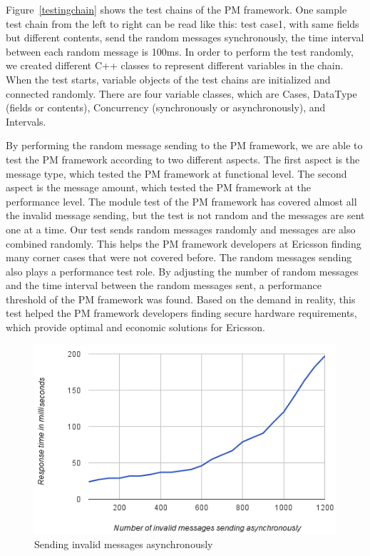 Figure~\ref{testingchain} shows the test chains of the PM framework. One sample test chain from the left to right can be read like this: test case1, with same fields but different contents, send the random messages synchronously, the time interval between each random message is 100ms. In order to perform the test randomly, we created different C++ classes to represent different variables in the chain. When the test starts, variable objects of the test chains are initialized and connected randomly. There are four variable classes, which are Cases, DataType (fields or contents), Concurrency (synchronously or asynchronously), and Intervals.

By performing the random message sending to the PM framework, we are able to test the PM framework according to two different aspects. The first aspect is the message type, which tested the PM framework at functional level. The second aspect is the message amount, which tested the PM framework at the performance level. The module test of the PM framework has covered almost all the invalid message sending, but the test is not random and the messages are sent one at a time. Our test sends random messages randomly and messages are also combined randomly. This helps the PM framework developers at Ericsson finding many corner cases that were not covered before. %
The random messages sending also plays a performance test role. By adjusting the number of random messages and the time interval between the random messages sent, a performance threshold of the PM framework was found. Based on the demand in reality, this test helped the PM framework developers finding secure hardware requirements, which provide optimal and economic solutions for Ericsson.

\begin{figure}[h!]
\centering
\includegraphics[width=\columnwidth]{figure/asynseding.png}
\caption{Sending invalid messages asynchronously \label{asynseding}}
\end{figure}

